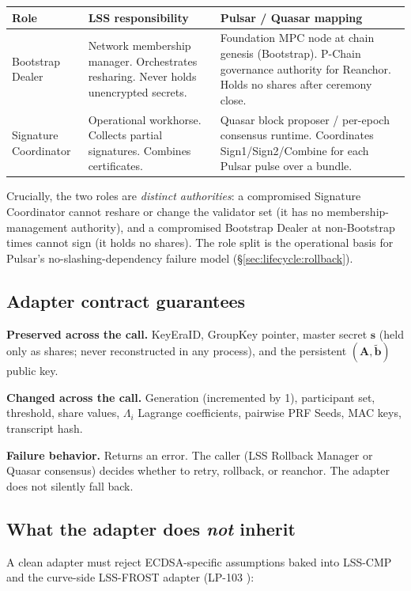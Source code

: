 \begin{tabular}{@{}p{}p{}p{}@{}}
  \toprule
  \textbf{Role} & \textbf{LSS responsibility} & \textbf{Pulsar / Quasar mapping} \\
  \midrule
  Bootstrap Dealer & Network membership manager. Orchestrates resharing. Never holds unencrypted secrets. & Foundation MPC node at chain genesis (Bootstrap). P-Chain governance authority for Reanchor. Holds no shares after ceremony close. \\
  Signature Coordinator & Operational workhorse. Collects partial signatures. Combines certificates. & Quasar block proposer / per-epoch consensus runtime. Coordinates Sign1/Sign2/Combine for each Pulsar pulse over a bundle. \\
  \bottomrule
\end{tabular}

Crucially, the two roles are \emph{distinct authorities}: a compromised
Signature Coordinator cannot reshare or change the validator set
(it has no membership-management authority), and a compromised
Bootstrap Dealer at non-Bootstrap times cannot sign (it holds no
shares). The role split is the operational basis for Pulsar's
no-slashing-dependency failure model
(\S\ref{sec:lifecycle:rollback}).

\subsection{Adapter contract guarantees}

\textbf{Preserved across the call.} KeyEraID, GroupKey pointer, master
secret $\mathbf{s}$ (held only as shares; never reconstructed in any
process), and the persistent $(\mathbf{A}, \tilde{\mathbf{b}})$ public
key.

\textbf{Changed across the call.} Generation (incremented by 1),
participant set, threshold, share values, $\Lambda_i$ Lagrange
coefficients, pairwise PRF Seeds, MAC keys, transcript hash.

\textbf{Failure behavior.} Returns an error. The caller (LSS Rollback
Manager or Quasar consensus) decides whether to retry, rollback, or
reanchor. The adapter does not silently fall back.

\subsection{What the adapter does \emph{not} inherit}

A clean adapter must reject ECDSA-specific assumptions baked into
LSS-CMP and the curve-side LSS-FROST adapter (LP-103 \cite{lp103}):

